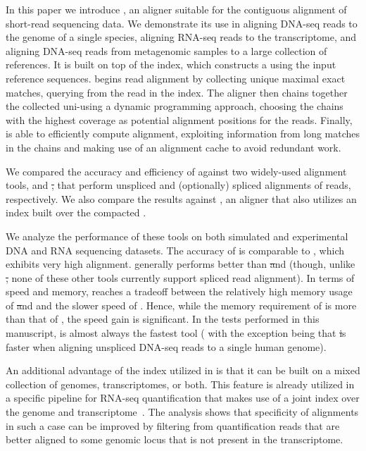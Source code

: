 In this paper we introduce \puffaligner, an aligner suitable for the
contiguous alignment of short-read sequencing data. We demonstrate its
use in aligning DNA-seq reads to the genome of a single species, aligning RNA-seq reads
to the transcriptome, and aligning DNA-seq reads from metagenomic samples to a 
large collection of references. It is built on top of the \pufferfish index, which constructs
a \ccdbg using the input reference sequences. \puffaligner begins read
alignment by collecting unique maximal exact matches, querying \kmers from the
read in the \pufferfish index. The aligner then chains together the collected
uni-\mems using a dynamic programming approach, choosing the chains with the
highest coverage as potential alignment positions for the reads. Finally,
\puffaligner is able to efficiently compute alignment,
exploiting information from long matches in the chains and making use of an 
alignment cache to avoid redundant work.

We compared the accuracy and efficiency of \puffaligner against two
widely-used alignment tools, \bt and \st, that perform unspliced and
(optionally) spliced alignments of reads, respectively. We also compare
the results against \debga, an aligner that also utilizes an index built
over the compacted \dbg.

We analyze the performance of these tools on both simulated and
experimental DNA and RNA sequencing datasets. The accuracy of
\puffaligner is comparable to \bt, which exhibits very high  
alignment. \puffaligner generally performs better than \st and \debga
(though, unlike \st, none of these other tools currently support spliced read
alignment). In terms of speed and memory, \puffaligner reaches a tradeoff
between the relatively high memory usage of \st and \debga and the slower
speed of \bt. Hence, while the memory requirement of \puffaligner is more
than that of \bt, the speed gain is significant.  In the tests performed 
in this manuscript, \puffaligner is almost always the fastest tool (
with the exception being that \st is faster when aligning unspliced 
DNA-seq reads to a single human genome).

An additional advantage of the \pufferfish index utilized in \puffaligner
is that it can be built on a mixed collection of genomes, transcriptomes,
or both. This feature is already utilized in a specific pipeline for
RNA-seq quantification that makes use of a joint index over the genome 
and transcriptome~\citep{srivastava2019alignment}. The analysis shows 
that specificity of alignments in such a case can be improved by filtering 
from quantification reads that are better aligned to some genomic locus 
that is not present in the transcriptome.

